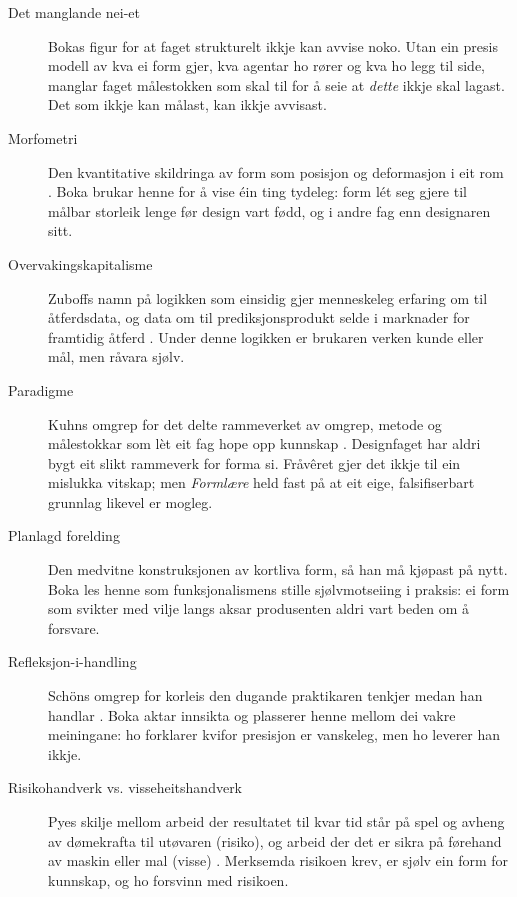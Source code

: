 \begin{description}
\item[Det manglande nei-et] Bokas figur for at faget strukturelt ikkje kan avvise noko. Utan ein presis modell av kva ei form gjer, kva agentar ho rører og kva ho legg til side, manglar faget målestokken som skal til for å seie at \emph{dette} ikkje skal lagast. Det som ikkje kan målast, kan ikkje avvisast.

\item[Morfometri] Den kvantitative skildringa av form som posisjon og deformasjon i eit rom \autocite{thompson1917growth}. Boka brukar henne for å vise éin ting tydeleg: form lét seg gjere til målbar storleik lenge før design vart fødd, og i andre fag enn designaren sitt.

\item[Overvakingskapitalisme] Zuboffs namn på logikken som einsidig gjer menneskeleg erfaring om til åtferdsdata, og data om til prediksjonsprodukt selde i marknader for framtidig åtferd \autocite{zuboff2019}. Under denne logikken er brukaren verken kunde eller mål, men råvara sjølv.

\item[Paradigme] Kuhns omgrep for det delte rammeverket av omgrep, metode og målestokkar som lèt eit fag hope opp kunnskap \autocite{kuhn1962}. Designfaget har aldri bygt eit slikt rammeverk for forma si. Fråvêret gjer det ikkje til ein mislukka vitskap; men \emph{Formlære} held fast på at eit eige, falsifiserbart grunnlag likevel er mogleg.

\item[Planlagd forelding] Den medvitne konstruksjonen av kortliva form, så han må kjøpast på nytt. Boka les henne som funksjonalismens stille sjølvmotseiing i praksis: ei form som svikter med vilje langs aksar produsenten aldri vart beden om å forsvare.

\item[Refleksjon-i-handling] Schöns omgrep for korleis den dugande praktikaren tenkjer medan han handlar \autocite{schon1983,schon1987educating}. Boka aktar innsikta og plasserer henne mellom dei vakre meiningane: ho forklarer kvifor presisjon er vanskeleg, men ho leverer han ikkje.

\item[Risikohandverk vs. visseheitshandverk] Pyes skilje mellom arbeid der resultatet til kvar tid står på spel og avheng av dømekrafta til utøvaren (risiko), og arbeid der det er sikra på førehand av maskin eller mal (visse) \autocite{pye1968}. Merksemda risikoen krev, er sjølv ein form for kunnskap, og ho forsvinn med risikoen.


\end{description}
